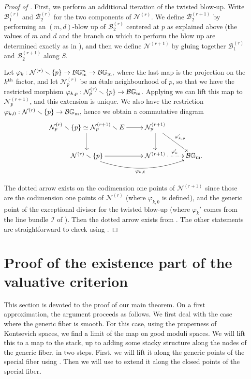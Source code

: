 \documentclass{amsart}
\newcommand{\bG}{\mathbb{G}}
\newcommand{\cB}{\mathcal{B}}
\newcommand{\cI}{\mathcal{I}}
\newcommand{\cN}{\mathcal{N}}
\newcommand{\Gm}{\bG_{{\rm m}}}
\theoremstyle{definition}
\begin{document}
\begin{proof}[Proof of ]
First, we perform an additional iteration of the twisted blow-up.
Write $\cB_1^{(r)}$ and $\cB_2^{(r)}$ for the two components of $\cN^{(r)}$. We define $\cB_2^{(r+1)}$ by performing an $(m,d)$-blow up of $\cB_2^{(r)}$ centered at $p$ as explained above (the values of $m$ and $d$ and the branch on which to perform the blow up are determined exactly as in ), and then we define $\cN^{(r+1)}$ by gluing together $\cB_1^{(r)}$ and $\cB_2^{(r+1)}$ along $S$.

Let $\varphi_k:\cN^{(r)}\smallsetminus\{p\}\to \cB\Gm^n\to \cB\Gm$, where the last map is the projection on the $k^{\rm th}$ factor, and let $\cN_p^{(r)}$ be an \'etale neighbourhood of $p$, so that we have the restricted morphism $\varphi_{k,p}:\cN_p^{(r)}\smallsetminus\{p\}\to \cB\Gm$. Applying  we can lift this map to $\cN_p^{(r+1)}$, and this extension is unique. We also have the restriction $\varphi_{k,0}:\cN^{(r)}\smallsetminus\{p\}\to \cB\Gm$, hence we obtain a commutative diagram
$$\xymatrix{\cN^{(r)}_p\smallsetminus\{p\}\simeq \cN^{(r+1)}_p\smallsetminus E \ar[r] \ar[d] & \cN_{p}^{(r+1)} \ar[d] \ar[dr]^{\varphi'_{k,p}} & \\ \cN^{(r)}\smallsetminus\{p\} \ar[r]\ar@/_1.5pc/[rr]_{\varphi_{k,0}}  & \cN^{(r+1)} \ar@{..>}[r]^{\varphi_k'}& \cB\Gm.}$$

The dotted arrow exists on the codimension one points of $\cN^{(r+1)}$ since those are the codimension one points of $\cN^{(r)}$ (where $\varphi_{k,0}$ is defined), and the generic point of the exceptional divisor for the twisted blow-up (where $\varphi_{k}'$ comes from the line bundle $\cI$ of ). Then the dotted arrow exists from . The other statements are straightforward to check using .
\end{proof}




\section{Proof of the existence part of the valuative criterion}\label{section proof val criterion}
This section is devoted to the proof of our main theorem. On a first approximation,  the argument proceeds as follows.  We first deal with the case where the generic fiber is smooth.  For this case, using the properness of Kontsevich spaces,  we find a limit of the map on good moduli spaces. We will lift this to a map to the stack,
up to adding some stacky structure along the nodes of the generic fiber, in two steps. First, we will lift it along the generic points of the special fiber using . Then we will use  to extend it along the closed points of the special fiber. 
\end{document}

